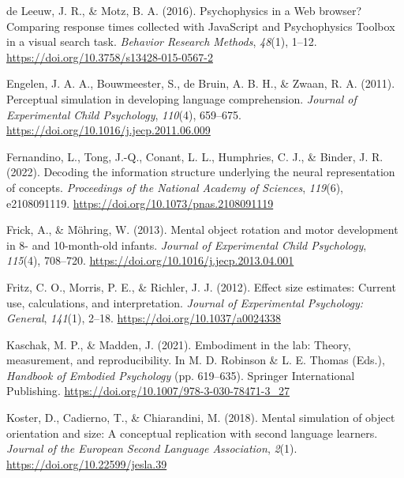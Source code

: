 \documentclass[
  man,floatsintext]{apa7}
\newlength{\cslhangindent}
\newlength{\cslentryspacingunit} %
\newenvironment{CSLReferences}[2] %
 {%
  \setlength{\parindent}{0pt}
  \ifodd #1
  \let\oldpar\par
  \def\par{\hangindent=\cslhangindent\oldpar}
  \fi
  \setlength{\parskip}{#2\cslentryspacingunit}
 }%
 {}
\begin{document}
\begin{CSLReferences}{1}{0}
\leavevmode{}%
de Leeuw, J. R., \& Motz, B. A. (2016). Psychophysics in a {Web} browser? {Comparing} response times collected with {JavaScript} and {Psychophysics Toolbox} in a visual search task. \emph{Behavior Research Methods}, \emph{48}(1), 1--12. \url{https://doi.org/10.3758/s13428-015-0567-2}

\leavevmode{}%
Engelen, J. A. A., Bouwmeester, S., de Bruin, A. B. H., \& Zwaan, R. A. (2011). Perceptual simulation in developing language comprehension. \emph{Journal of Experimental Child Psychology}, \emph{110}(4), 659--675. \url{https://doi.org/10.1016/j.jecp.2011.06.009}

\leavevmode{}%
Fernandino, L., Tong, J.-Q., Conant, L. L., Humphries, C. J., \& Binder, J. R. (2022). Decoding the information structure underlying the neural representation of concepts. \emph{Proceedings of the National Academy of Sciences}, \emph{119}(6), e2108091119. \url{https://doi.org/10.1073/pnas.2108091119}

\leavevmode{}%
Frick, A., \& Möhring, W. (2013). Mental object rotation and motor development in 8- and 10-month-old infants. \emph{Journal of Experimental Child Psychology}, \emph{115}(4), 708--720. \url{https://doi.org/10.1016/j.jecp.2013.04.001}

\leavevmode{}%
Fritz, C. O., Morris, P. E., \& Richler, J. J. (2012). Effect size estimates: Current use, calculations, and interpretation. \emph{Journal of Experimental Psychology: General}, \emph{141}(1), 2--18. \url{https://doi.org/10.1037/a0024338}

\leavevmode{}%
Kaschak, M. P., \& Madden, J. (2021). Embodiment in the {lab}: {Theory}, {measurement}, and {reproducibility}. In M. D. Robinson \& L. E. Thomas (Eds.), \emph{Handbook of {Embodied Psychology}} (pp. 619--635). {Springer International Publishing}. \url{https://doi.org/10.1007/978-3-030-78471-3_27}

\leavevmode{}%
Koster, D., Cadierno, T., \& Chiarandini, M. (2018). Mental simulation of object orientation and size: {A} conceptual replication with second language learners. \emph{Journal of the European Second Language Association}, \emph{2}(1). \url{https://doi.org/10.22599/jesla.39}


\end{CSLReferences}
\end{document}
